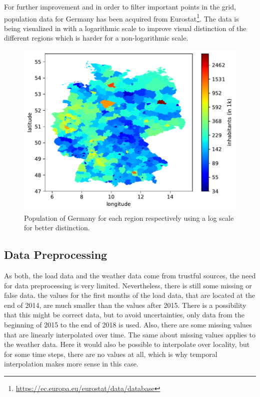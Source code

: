 For further improvement and in order to filter important points in the grid, population data for Germany has been acquired from Eurostat\footnote{\url{https://ec.europa.eu/eurostat/data/database}}. The data is being visualized in  with a logarithmic scale to improve visual distinction of the different regions which is harder for a non-logarithmic scale.\\

\begin{figure}[h!]%
\centering
\includegraphics[width=\textwidth]{plots/demo/demo2018_logscale}%
\caption{Population of Germany for each region respectively using a log scale for better distinction.}%
\label{fig:demo2018_logscale}%
\end{figure}


\subsection*{Data Preprocessing}

As both, the load data and the weather data come from trustful sources, the need for data preprocessing is very limited. Nevertheless, there is still some missing or false data. \Eg the values for the first months of the load data, that are located at the end of 2014, are much smaller than the values after 2015. There is a possibility that this might be correct data, but to avoid uncertainties, only data from the beginning of 2015 to the end of 2018 is used. Also, there are some missing values that are linearly interpolated over time. The same about missing values applies to the weather data. Here it would also be possible to interpolate over locality, but for some time steps, there are no values at all, which is why temporal interpolation makes more sense in this case.\\


